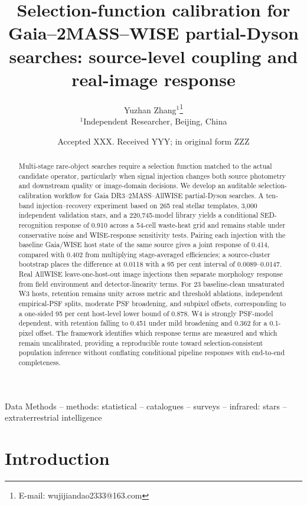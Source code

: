 \documentclass[fleqn,usenatbib]{mnras}
\title[Selection calibration for partial-Dyson searches]{Selection-function calibration for Gaia--2MASS--WISE partial-Dyson searches: source-level coupling and real-image response}
\author[Zhang]{
Yuzhan Zhang$^{1}$\orcidlink{0009-0000-3121-7972}\thanks{E-mail: wujijiandao2333@163.com}
\\
$^{1}$Independent Researcher, Beijing, China
}
\date{Accepted XXX. Received YYY; in original form ZZZ}
\begin{document}
\label{firstpage}
\pagerange{\pageref{firstpage}--\pageref{lastpage}}
\maketitle

\begin{abstract}
Multi-stage rare-object searches require a selection function matched to the actual candidate operator, particularly when signal injection changes both source photometry and downstream quality or image-domain decisions. We develop an auditable selection-calibration workflow for Gaia DR3--2MASS--AllWISE partial-Dyson searches. A ten-band injection--recovery experiment based on 265 real stellar templates, 3,000 independent validation stars, and a 220,745-model library yields a conditional SED-recognition response of 0.910 across a 54-cell waste-heat grid and remains stable under conservative noise and WISE-response sensitivity tests. Pairing each injection with the baseline Gaia/WISE host state of the same source gives a joint response of 0.414, compared with 0.402 from multiplying stage-averaged efficiencies; a source-cluster bootstrap places the difference at 0.0118 with a 95 per cent interval of 0.0089--0.0147. Real AllWISE leave-one-host-out image injections then separate morphology response from field environment and detector-linearity terms. For 23 baseline-clean unsaturated W3 hosts, retention remains unity across metric and threshold ablations, independent empirical-PSF splits, moderate PSF broadening, and subpixel offsets, corresponding to a one-sided 95 per cent host-level lower bound of 0.878. W4 is strongly PSF-model dependent, with retention falling to 0.451 under mild broadening and 0.362 for a 0.1-pixel offset. The framework identifies which response terms are measured and which remain uncalibrated, providing a reproducible route toward selection-consistent population inference without conflating conditional pipeline responses with end-to-end completeness.
\end{abstract}

\begin{keywords}
Data Methods -- methods: statistical -- catalogues -- surveys -- infrared: stars -- extraterrestrial intelligence
\end{keywords}

\section{Introduction}
\end{document}
